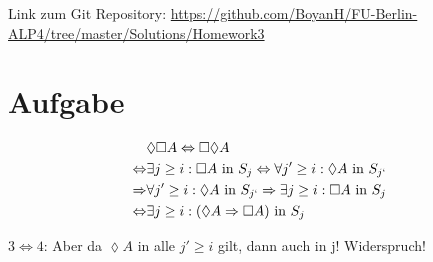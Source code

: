 \usepackage{graphicx}
\usepackage{amsmath}
\usepackage{amssymb}

\newcommand{\dozent}{Prof. Dr. Margarita Esponda}					%
\newcommand{\tutor}{Lilli Walter}						%
\newcommand{\tutoriumNo}{6}				%
\newcommand{\projectNo}{3}									%
\newcommand{\veranstaltung}{Nichtsequentielle Programmierung}	%
\newcommand{\semester}{SoeSe 2017}						%
\newcommand{\studenten}{Boyan Hristov, Sergelen Gongor}			%





Link zum Git Repository: \url{https://github.com/BoyanH/FU-Berlin-ALP4/tree/master/Solutions/Homework3}

\section{Aufgabe}

\begin{align}
	& \lozenge \square A \Leftrightarrow \square \lozenge A \\
	\Leftrightarrow & \exists j \geq i: \square A \text{ in } S_j \Leftrightarrow 
	\forall j' \geq i: \lozenge A \text{ in } S_{j`} \\
	\Rightarrow &  \forall j' \geq i: \lozenge A \text{ in } S_{j`} \Rightarrow 
	\exists j \geq i: \square A \text{ in } S_j \\
	\Leftrightarrow & \exists j \geq i: ( \lozenge A \Rightarrow \square A ) \text{ in } S_j
\end{align}

$3 \Leftrightarrow 4$: Aber da $\lozenge A$ in alle $j' \geq i$ gilt, dann auch in j! Widerspruch! 


